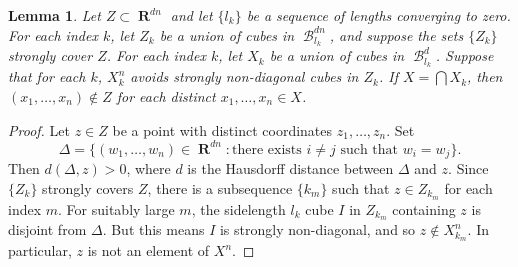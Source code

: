 \documentclass[dvipsnames,letterpaper,12pt]{article}
\numberwithin{equation}{section}
\theoremstyle{plain}
\newtheorem{lemma}{Lemma}
\DeclareMathOperator{\RR}{\mathbf{R}}
\DeclareMathOperator{\B}{\mathcal{B}}
\begin{document}
\begin{lemma} \label{stronglydiagonal}
	Let $Z \subset \RR^{dn}$ and let $\{ l_k \}$ be a sequence of lengths converging to zero. For each index $k$, let $Z_k$ be a union of cubes in $\B^{dn}_{l_k}$, and suppose the sets $\{ Z_k \}$ strongly cover $Z$. For each index $k$, let $X_k$ be a union of cubes in $\B^d_{l_k}$. Suppose that for each $k$, $X_k^n$ avoids strongly non-diagonal cubes in $Z_k$. If $X = \bigcap X_k$, then $(x_1, \dots, x_n) \not \in Z$ for each distinct $x_1, \dots, x_n \in X$.
\end{lemma}
\begin{proof}
	Let $z \in Z$ be a point with distinct coordinates $z_1, \dots, z_n$. Set
	\[ \Delta = \{ (w_1, \dots, w_n) \in \RR^{dn}: \text{there exists $i \neq j$ such that $w_i = w_j$} \}. \]
	Then $d(\Delta,z) > 0$, where $d$ is the Hausdorff distance between $\Delta$ and $z$. Since $\{ Z_k \}$ strongly covers $Z$, there is a subsequence $\{ k_m \}$ such that $z \in Z_{k_m}$ for each index $m$. For suitably large $m$, the sidelength $l_k$ cube $I$ in $Z_{k_m}$ containing $z$ is disjoint from $\Delta$. But this means $I$ is strongly non-diagonal, and so $z \not \in X_{k_m}^n$. In particular, $z$ is not an element of $X^n$.
\end{proof}

\end{document}
